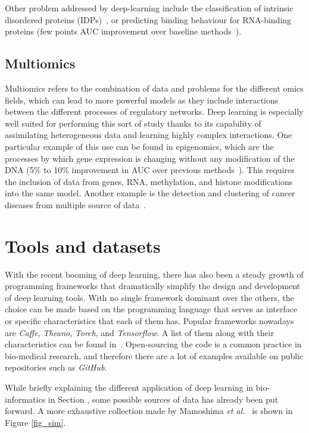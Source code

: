 \documentclass[journal]{IEEEtran}
\begin{document}
Other problem addressed by deep-learning include the classification of intrinsic disordered proteins (IDPs)~\cite{Wang2015}, or predicting binding behaviour for RNA-binding proteins (few points AUC improvement over baseline methods~\cite{Zhang2015}).

\subsection{Multiomics}
Multiomics refers to the combination of data and problems for the different omics fields, which can lead to more powerful models as they include interactions between the different processes of regulatory networks. Deep learning is especially well suited for performing this sort of study thanks to its capability of assimilating heterogeneous data and learning highly complex interactions. One particular example of this use can be found in epigenomics, which are the processes by which gene expression is changing without any modification of the DNA (5\% to 10\% improvement in AUC over previous methods~\cite{Zhou2015}). This requires the inclusion of data from genes, RNA, methylation, and histone modifications into the same model. Another example is the detection and clustering of cancer diseases from multiple source of data~\cite{Liang2015}.

\section{Tools and datasets}

With the recent booming of deep learning, there has also been a steady growth of programming frameworks that dramatically simplify the design and development of deep learning tools. With no single framework dominant over the others, the choice can be made based on the programming language that serves as interface or specific characteristics that each of them has. Popular frameworks nowadays are \textit{Caffe}, \textit{Theano}, \textit{Torch}, and \textit{Tensorflow}. A list of them along with their characteristics can be found in~\cite{Ravi2017}. Open-sourcing the code is a common practice in bio-medical research, and therefore there are a lot of examples available on public repositories such as \textit{GitHub}.

While briefly explaining the different application of deep learning in bio-informatics in Section \pageref{bio-apps}, some possible sources of data has already been put forward. A more exhaustive collection made by Mamoshima \textit{et al.}~\cite{Mamoshina2016} is shown in Figure \ref{fig_sim}.
\end{document}
